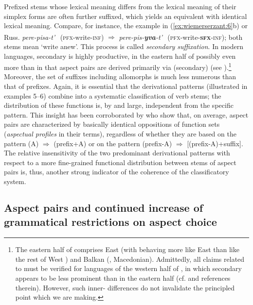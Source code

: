\documentclass[output=paper]{langsci/langscibook}
\begin{document}
Prefixed stems whose lexical meaning differs from the lexical meaning of their simplex forms are often further suffixed, which yields an  equivalent with identical lexical meaning. Compare, for instance, the  example in (\ref{ex:wiemerserzant:6}b) or Russ. 
\textit{pere-pisa-t’}{\textsuperscript{~}\PFV} (\textsc{pfx}-write-\textsc{inf}) 
${\Rightarrow}$ \textit{pere-pis-\textbf{{yva}}-t’}{\textsuperscript{~}\IPFV} (\textsc{pfx}-write\-\-\--\textbf{\textsc{sfx}}\textsc{-inf}); 
both stems mean ‘write anew’. This process is called \textit{secondary suffixation}. 
In modern  languages, secondary  is highly productive, in the eastern half of  possibly even more than  in that aspect pairs are derived primarily via (secondary)  (see ).\footnote{The eastern half of  comprises East  (with  behaving more like East  than like the rest of West ) and Balkan  (, Macedonian). Admittedly, all claims related to  must be verified for languages of the western half of , in which secondary  appears to be less prominent than in the eastern half (cf. \citealt[124–125]{Arkadiev2015} and references therein). However, such inner- differences do not invalidate the principled point which we are making.} Moreover, the set of suffixes including allomorphs is much less numerous than that of prefixes. Again, it is essential that the derivational patterns (illustrated in examples 5--6) combine into a systematic classification of verb stems; the distribution of these functions is, by and large, independent from the specific pattern. This insight has been corroborated by \citet{Janda2011} who show that, on average,  aspect pairs are characterized by basically identical oppositions of function sets (\textit{aspectual profiles} in their terms), regardless of whether they are based on the pattern  (A){\IPFV} ${\Rightarrow}$ (prefix+A){\PFV} or on the pattern (prefix-A){\PFV} ${\Rightarrow}$ [(prefix-A)+suffix]{\IPFV}. The relative insensitivity of the two predominant derivational patterns with respect to a more fine-grained functional distribution between stems of aspect pairs is, thus, another strong indicator of the coherence of the classificatory system. 

\subsection{Aspect pairs and continued increase of grammatical restrictions on aspect choice}\label{sec:wiemerserzant:2.5}
\end{document}
